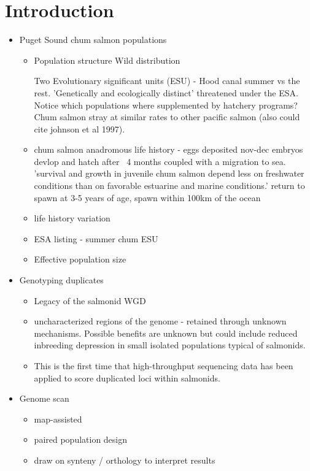 \documentclass[12pt,  one column]{article}
\begin{document}
\section*{Introduction}
\begin{itemize}

\item Puget Sound chum salmon populations
\begin{itemize}
\item Population structure
Wild distribution

Two Evolutionary significant units (ESU) - Hood canal summer vs the rest. 'Genetically and ecologically distinct' threatened under the ESA. Notice which populations where supplemented by hatchery programs?
Chum salmon stray at similar rates to other pacific salmon \cite{Small2014} (also could cite johnson et al 1997).

\item chum salmon anadromous life history - 
eggs deposited nov-dec
embryos devlop and hatch after ~4 months coupled with a migration to sea. 'survival and growth in juvenile chum salmon depend less on freshwater conditions than on favorable estuarine and marine conditions.'
return to spawn at 3-5 years of age, spawn within 100km of the ocean

\item life history variation
\item ESA listing - summer chum ESU
\item Effective population size
\end{itemize}

\item Genotyping duplicates
\begin{itemize}
\item Legacy of the salmonid WGD
\item uncharacterized regions of the genome - retained through unknown mechanisms. Possible benefits are unknown but could include reduced inbreeding depression in small isolated populations typical of salmonids.
\item This is the first time that high-throughput sequencing data has been applied to score duplicated loci within salmonids.
\end{itemize}

\item Genome scan
\begin{itemize}
\item map-assisted
\item paired population design
\item draw on synteny / orthology to interpret results
\end{itemize}


\end{itemize}
\end{document}
